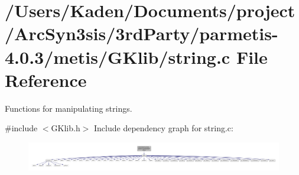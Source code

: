\hypertarget{a00143}{}\section{/\+Users/\+Kaden/\+Documents/project/\+Arc\+Syn3sis/3rd\+Party/parmetis-\/4.0.3/metis/\+G\+Klib/string.c File Reference}
\label{a00143}


Functions for manipulating strings.  


{\ttfamily \#include $<$G\+Klib.\+h$>$}\newline
Include dependency graph for string.\+c\+:\nopagebreak
\begin{figure}[H]
\begin{center}
\leavevmode
\includegraphics[width=350pt]{a00144}
\end{center}
\end{figure}
